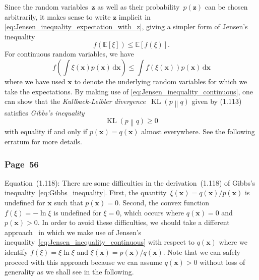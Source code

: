\documentclass[12pt,a4paper]{article}
\newcommand{\erratum}[1]{%
\subsubsection*{#1}
\addcontentsline{toc}{subsection}{#1}}
\begin{document}
Since the random variables~$\mathbf{z}$ as well as their probability~$p(\mathbf{z})$ can be chosen
arbitrarily,
it makes sense to write $\mathbf{z}$ implicit in \eqref{eq:Jensen_inequality_expectation_with_z},
giving a simpler form of Jensen's inequality
\begin{equation}
f\left(\mathbb{E}\left[\xi\right]\right)
\leqslant \mathbb{E}\left[f\left(\xi\right)\right] .
\end{equation}
For continuous random variables, we have
\begin{equation}
f\left(\int\xi(\mathbf{x}) p(\mathbf{x}) \,\mathrm{d}\mathbf{x}\right) \leqslant
\int f\left(\xi(\mathbf{x})\right) p(\mathbf{x}) \,\mathrm{d}\mathbf{x}
\label{eq:Jensen_inequality_continuous}
\end{equation}
where we have used $\mathbf{x}$ to denote the underlying random variables
for which we take the expectations.
By making use of \eqref{eq:Jensen_inequality_continuous},
one can show that
the \emph{Kullback-Leibler divergence}~$\operatorname{KL}\left( p \middle\| q \right)$
given by (1.113) satisfies \emph{Gibbs's inequality}
\begin{equation}
\operatorname{KL}\left( p \middle\| q \right) \geqslant 0
\label{eq:Gibbs_inequality}
\end{equation}
with equality if and only if $p(\mathbf{x}) = q(\mathbf{x})$ almost everywhere.
See the following erratum for more details.

\erratum{Page~56}
Equation~(1.118):
There are some difficulties in the derivation~(1.118) of
Gibbs's inequality~\eqref{eq:Gibbs_inequality}.
First, the quantity~$\xi(\mathbf{x}) = q(\mathbf{x})/p(\mathbf{x})$ is undefined for $\mathbf{x}$
such that $p(\mathbf{x}) = 0$.
Second, the convex function~$f(\xi) = -\ln\xi$ is undefined for $\xi = 0$,
which occurs where $q(\mathbf{x}) = 0$ and $p(\mathbf{x}) > 0$.
In order to avoid these difficulties,
we should take a different approach~\citep{MacKay:Information,KullbackLeibler:Information}
in which we make use of Jensen's inequality~\eqref{eq:Jensen_inequality_continuous}
with respect to $q(\mathbf{x})$ where
we identify $f(\xi) = \xi\ln\xi$ and
$\xi(\mathbf{x}) = p(\mathbf{x})/q(\mathbf{x})$.
Note that we can safely proceed with this approach
because we can assume $q(\mathbf{x}) > 0$
without loss of generality as we shall see in the following.
\end{document}
